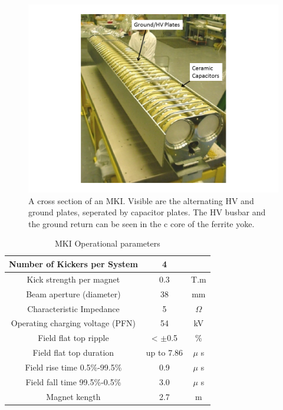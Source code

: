 \begin{figure}
\begin{center}
\includegraphics[height=0.4\textwidth]{LHC_MKI/figures/mki-out-vac-tank.png}
\end{center}
\caption{A cross section of an MKI. Visible are the alternating HV and ground plates, seperated by capacitor plates. The HV busbar and the ground return can be seen in the c core of the ferrite yoke.}
\label{fig:lhc-mki-cross-section}
\end{figure}

\begin{table}
\caption{MKI Operational parameters}

\begin{center}
\begin{tabular}{c | c | c}
Number of Kickers per System & 4 & \\ \hline
Kick strength per magnet & 0.3 & T.m \\ \hline
Beam aperture (diameter) & 38 & mm \\ \hline
Characteristic Impedance & 5 & $\Omega$ \\ \hline
Operating charging voltage (PFN) & 54 & kV \\ \hline
Field flat top ripple & < $\pm$0.5 & \% \\ \hline
Field flat top duration & up to 7.86 & $\mu$ s \\ \hline
Field rise time 0.5\%-99.5\% & 0.9 & $\mu$ s \\ \hline
Field fall time 99.5\%-0.5\% & 3.0 & $\mu$ s \\ \hline
Magnet kength & 2.7 & m \\ 
\end{tabular}
\end{center}
\label{tab:mki-parameters}
\end{table}